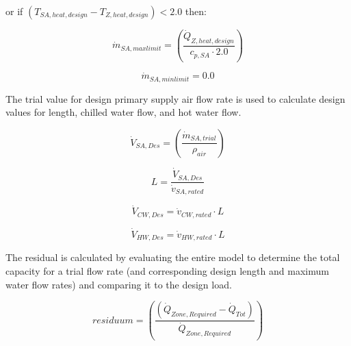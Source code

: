 or if \(( {T_{SA,heat,design } } - {T_{Z,heat,design } }) < 2.0\) then:

\begin{equation}
  {\dot m_{SA,max limit}} = { \left(\frac{{\dot Q_{Z,heat,design } }}{{c_{p,SA}} \cdot 2.0 } \right) }
\end{equation}

\begin{equation}
  {\dot m_{SA,min limit}} = {0.0}
\end{equation}

The trial value for design primary supply air flow rate is used to calculate design values for length, chilled water flow, and hot water flow.

\begin{equation}
  {\dot V_{SA,Des}} = { \left(\frac{ {\dot m_{SA,trial}} }{{\rho_{air}} } \right) }
\end{equation}

\begin{equation}
  {L} = {\frac{{\dot V_{SA,Des}}}{{\dot v_{SA,rated}}}  }
\end{equation}

\begin{equation}
  {\dot V_{CW,Des}} = {{\dot v_{CW,rated}} \cdot {L} }
\end{equation}

\begin{equation}
  {\dot V_{HW,Des}} = {{\dot v_{HW,rated}} \cdot {L} }
\end{equation}

The residual is calculated by evaluating the entire model to determine the total capacity for a trial flow rate (and corresponding design length and maximum water flow rates) and comparing it to the design load.

\begin{equation}
  {residuum} = \left(\frac{ ({\dot Q_{Zone, Required}} - {\dot Q_{Tot}} )}{{\dot Q_{Zone, Required}}}\right)
\end{equation}

